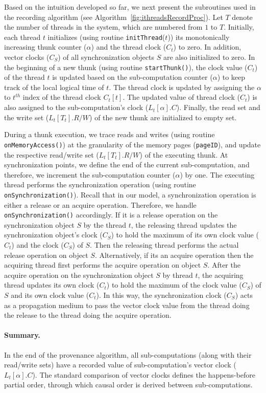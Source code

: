 Based on the intuition developed so far, we next present the
subroutines used in the recording algorithm (see
Algorithm~\ref{fig:ithreadsRecordProc}). Let $T$ denote the number of threads in the system, which are numbered from $1$ to $T$.  Initially, each thread $t$ initializes (using routine {\tt initThread}($t$)) its monotonically increasing thunk
counter ($\alpha$) and the thread clock ($C_t$) to zero. In addition, vector clocks ($C_S$) of all synchronization objects $S$ are also initialized to zero. 
In the beginning of a new thunk (using routine {\tt startThunk()}), the clock value ($C_t$) of the thread $t$ is
updated based on the sub-computation  counter ($\alpha$) to keep track of the local logical time of $t$. The thread clock is updated by assigning the $\alpha$ to $t^{th}$ index of the thread clock $C_t[t]$. The updated value of thread clock ($C_t$)   is also assigned to the sub-computation's clock ($L_t[\alpha].C$). Finally, the read set and the write set
($L_t[T_t].R/W$) of the new thunk are initialized to empty set.

During a thunk execution, we trace reads and writes  (using routine {\tt onMemoryAccess()}) at the granularity of the
memory pages ({\tt pageID}), and update the respective read/write set
($L_t[T_t].R/W$) of the executing thunk.  
At synchronization points, we define the end of the current sub-computation, and therefore, we increment the sub-computation  counter ($\alpha$) by one. The executing thread performs the synchronization operation (using routine {\tt onSynchronization()}). Recall that in our model, a synchronization operation is either a release or an acquire operation. Therefore, we handle {\tt onSynchronization()} accordingly. If it is a release operation on the synchronization object $S$ by the thread $t$, the 
releasing thread updates the synchronization object's clock ($C_S$) to
hold the maximum of its own clock value ($C_{t}$) and the clock  ($C_S$) of $S$. Then the releasing thread performs the actual release operation  on object $S$. Alternatively, if its an acquire operation then the acquiring thread first performs the acquire  operation on object $S$. After the acquire operation on the synchronization object $S$ by
thread $t$, the acquiring thread updates its own clock ($C_{t}$) to hold the
maximum of the clock value  ($C_S$) of $S$  and its own clock value ($C_{t}$).  
In this way, the synchronization clock ($C_S$) acts as a propagation medium to pass the
vector clock value from the thread doing the release to the thread doing the acquire operation. 



\paragraph{Summary.} In the end of the provenance algorithm, all sub-computations (along with their read/write sets) have a recorded value of sub-computation's vector clock ($L_t[\alpha].C$). The standard comparison of vector clocks defines the  happens-before partial order, through which causal order is derived between sub-computations.


